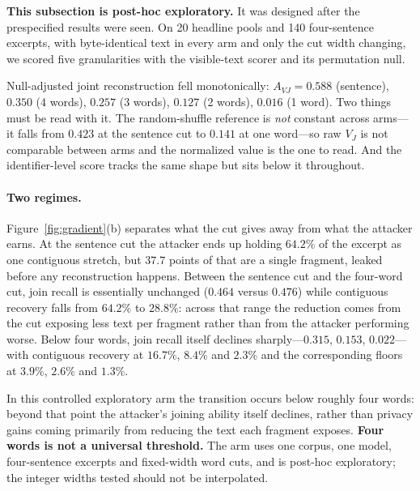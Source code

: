 \documentclass[sigconf,review]{acmart}
\newcommand{\VJ}{\ensuremath{V_{J}}}
\newcommand{\AVJ}{\ensuremath{A_{VJ}}}
\begin{document}
\textbf{This subsection is post-hoc exploratory.} It was designed after the
prespecified results were seen. On 20 headline pools and 140 four-sentence
excerpts, with byte-identical text in every arm and only the cut width
changing, we scored five granularities with the visible-text scorer and its
permutation null.

Null-adjusted joint reconstruction fell monotonically:
$\AVJ = 0.588$ (sentence), $0.350$ (4 words), $0.257$ (3 words), $0.127$
(2 words), $0.016$ (1 word). Two things must be read with it. The
random-shuffle reference is \emph{not} constant across arms---it falls from
$0.423$ at the sentence cut to $0.141$ at one word---so raw \VJ{} is not
comparable between arms and the normalized value is the one to read. And the
identifier-level score tracks the same shape but sits below it throughout.

\paragraph{Two regimes.}
Figure~\ref{fig:gradient}(b) separates what the cut gives away from what the attacker earns. At
the sentence cut the attacker ends up holding $64.2\%$ of the excerpt as one
contiguous stretch, but $37.7$ points of that are a single fragment, leaked
before any reconstruction happens. Between the sentence cut and the four-word
cut, join recall is essentially unchanged ($0.464$ versus $0.476$) while
contiguous recovery falls from $64.2\%$ to $28.8\%$: across that range the
reduction comes from the cut exposing less text per fragment rather than from
the attacker performing worse. Below four words, join recall itself declines
sharply---$0.315$, $0.153$, $0.022$---with contiguous recovery at $16.7\%$,
$8.4\%$ and $2.3\%$ and the corresponding floors at $3.9\%$, $2.6\%$ and
$1.3\%$.

In this controlled exploratory arm the transition occurs below roughly four
words: beyond that point the attacker's joining ability itself declines, rather
than privacy gains coming primarily from reducing the text each fragment
exposes. \textbf{Four words is not a universal threshold.} The arm uses one
corpus, one model, four-sentence excerpts and fixed-width word cuts, and is
post-hoc exploratory; the integer widths tested should not be interpolated.
\end{document}
